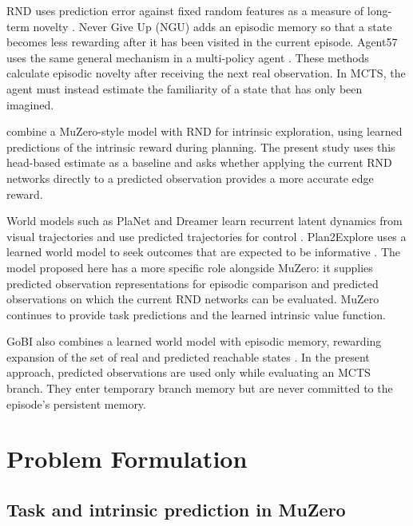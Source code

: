 \documentclass{article}
\begin{document}
RND uses prediction error against fixed random features as a measure of
long-term novelty \citep{rnd}. Never Give Up (NGU) adds an episodic memory so
that a state becomes less rewarding after it has been visited in the current
episode. Agent57 uses the same general mechanism in a multi-policy agent
\citep{ngu,agent57}. These methods calculate episodic novelty after receiving
the next real observation. In MCTS, the agent must instead estimate the
familiarity of a state that has only been imagined.

\citet{walker23} combine a MuZero-style model with RND for intrinsic
exploration, using learned predictions of the intrinsic reward during
planning. The present study uses this head-based estimate as a baseline
and asks whether applying the current RND networks directly to a predicted
observation provides a more accurate edge reward.

World models such as PlaNet and Dreamer learn recurrent latent dynamics from
visual trajectories and use predicted trajectories for control
\citep{planet,dreamer}. Plan2Explore uses a learned world model to seek outcomes
that are expected to be informative \citep{plan2explore}. The model proposed
here has a more specific role alongside MuZero: it supplies predicted
observation representations for episodic comparison and predicted observations
on which the current RND networks can be evaluated. MuZero continues to provide
task predictions and the learned intrinsic value function.

GoBI also combines a learned world model with episodic memory, rewarding
expansion of the set of real and predicted reachable states \citep{gobi}. In the
present approach, predicted observations are used only while evaluating an
MCTS branch. They enter temporary branch memory but are never committed to the
episode's persistent memory.

\section{Problem Formulation}

\subsection{Task and intrinsic prediction in MuZero}
\end{document}
